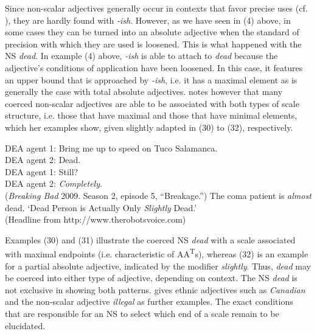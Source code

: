 \documentclass[output=paper
,modfonts
,nonflat]{langsci/langscibook}
\begin{document}
Since non-scalar adjectives generally occur in contexts that favor precise uses (cf. \citealt[95--96]{Burnett2017}), they are hardly found with \textit{-ish}. However, as we have seen in (4) above, in some cases they can be turned into an absolute adjective when the standard of precision with which they are used is loosened. This is what happened with the NS \textit{dead}. In example (4) above, \textit{-ish} is able to attach to \textit{dead} because the adjective's conditions of application have been loosened. In this case, it features an upper bound that is approached by \textit{-ish}, i.e. it has a maximal element as is generally the case with total absolute adjectives. \textcite[112--113]{Burnett2017} notes however that many coerced non-scalar adjectives are able to be associated with both types of scale structure, i.e. those that have maximal and those that have minimal elements, which her examples show, given slightly adapted in (30) to (32), respectively.

\ea
	    DEA agent 1: Bring me up to speed on Tuco Salamanca. \\
		DEA agent 2: Dead. \\
		DEA agent 1: Still? \\
		DEA agent 2: \textit{Completely}. \\
		(\textit{Breaking Bad} 2009. Season 2, episode 5, ``Breakage.'')
\z
\ea
	The coma patient is \textit{almost} dead.
\z
\ea
	`Dead Person is Actually Only \textit{Slightly} Dead.' \\ 
		(Headline from http://www.therobotsvoice.com)
\z

Examples (30) and (31) illustrate the coerced NS \textit{dead} with a scale associated with maximal endpoints (i.e. characteristic of AA\textsuperscript{T}s), whereas (32) is an example for a partial absolute adjective, indicated by the modifier \textit{slightly}. Thus, \textit{dead} may be coerced into either type of adjective, depending on context. The NS \textit{dead} is not exclusive in showing both patterns. \textcite[113]{Burnett2017} gives ethnic adjectives such as \textit{Canadian} and the non-scalar adjective \textit{illegal} as further examples. The exact conditions that are responsible for an NS to select which end of a scale remain to be elucidated.
\end{document}
